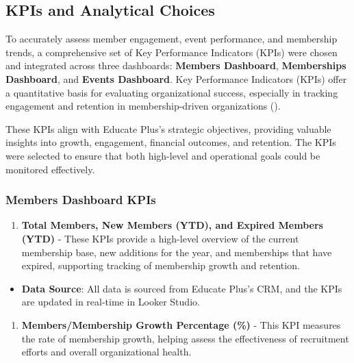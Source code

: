 \documentclass[11pt,a4paper,]{article}
\providecommand{\tightlist}{%
  \setlength{\itemsep}{0pt}\setlength{\parskip}{0pt}}
\begin{document}
\subsection{KPIs and Analytical Choices}\label{kpis-and-analytical-choices}

To accurately assess member engagement, event performance, and membership trends, a comprehensive set of Key Performance Indicators (KPIs) were chosen and integrated across three dashboards: \textbf{Members Dashboard}, \textbf{Memberships Dashboard}, and \textbf{Events Dashboard}. Key Performance Indicators (KPIs) offer a quantitative basis for evaluating organizational success, especially in tracking engagement and retention in membership-driven organizations (\textcite{kerzner2022project}).

These KPIs align with Educate Plus's strategic objectives, providing valuable insights into growth, engagement, financial outcomes, and retention. The KPIs were selected to ensure that both high-level and operational goals could be monitored effectively.

\subsubsection{Members Dashboard KPIs}\label{members-dashboard-kpis}

\begin{enumerate}
\def\labelenumi{\arabic{enumi}.}
\tightlist
\item
  \textbf{Total Members, New Members (YTD), and Expired Members (YTD)} - These KPIs provide a high-level overview of the current membership base, new additions for the year, and memberships that have expired, supporting tracking of membership growth and retention.
\end{enumerate}

\begin{itemize}
\tightlist
\item
  \textbf{Data Source}: All data is sourced from Educate Plus's CRM, and the KPIs are updated in real-time in Looker Studio.
\end{itemize}

\begin{enumerate}
\def\labelenumi{\arabic{enumi}.}
\setcounter{enumi}{1}
\tightlist
\item
  \textbf{Members/Membership Growth Percentage (\%)} - This KPI measures the rate of membership growth, helping assess the effectiveness of recruitment efforts and overall organizational health.
\end{enumerate}
\end{document}
